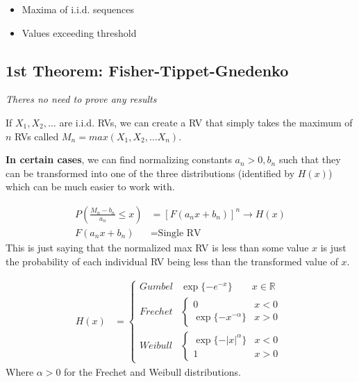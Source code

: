 \documentclass[
  oneside]{book}
\providecommand{\tightlist}{%
  \setlength{\itemsep}{0pt}\setlength{\parskip}{0pt}}
\begin{document}
\begin{itemize}
\tightlist
\item
  Maxima of i.i.d. sequences
\item
  Values exceeding threshold
\end{itemize}

\hypertarget{st-theorem-fisher-tippet-gnedenko}{%
\subsection{1st Theorem: Fisher-Tippet-Gnedenko}\label{st-theorem-fisher-tippet-gnedenko}}

\emph{Theres no need to prove any results}

If \(X_{1}, X_{2}, \dots\) are i.i.d. RVs, we can create a RV that simply takes the maximum of \(n\) RVs called \(M_{n} = max(X_{1}, X_{2}, \dots X_{n})\).

\textbf{In certain cases}, we can find normalizing constants \(a_{n}>0, b_{n}\) such that they can be transformed into one of the three distributions (identified by \(H(x)\)) which can be much easier to work with.

\[
\begin{aligned}
P\left( \frac{M_{n}-b_{n}}{a_{n}} \leq x\right) &= [F(a_{n}x+b_{n})]^{n} \to H(x)\\
F(a_{n}x+b_{n}) &= \text{Single RV}
\end{aligned}
\]
This is just saying that the normalized max RV is less than some value \(x\) is just the probability of each individual RV being less than the transformed value of \(x\).

\[
\begin{aligned}
H(x) &= \begin{cases}
Gumbel & \exp\{-e^{-x}\} \quad\quad x \in \mathbb{R}\\
Frechet & \begin{cases}
0 & x < 0 \\
\exp\{-x^{-\alpha}\}  & x >0
\end{cases}\\
Weibull  & \begin{cases}
\exp\{-|x|^{\alpha}\}  & x<0 \\
1 & x > 0
\end{cases}
\end{cases}
\end{aligned}
\]
Where \(\alpha > 0\) for the Frechet and Weibull distributions.
\end{document}
